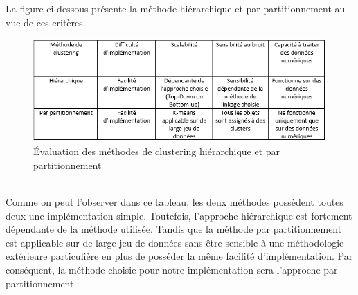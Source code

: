 \documentclass[memoire.tex]{subfiles}
\begin{document}
\newpage
La figure ci-dessous présente la méthode hiérarchique et par partitionnement au vue de ces critères.
	\begin{figure}[h!]
		\centerline{\includegraphics[scale=0.7]{img/comparatif_methodes_2.png}}
		\caption{Évaluation des méthodes de clustering hiérarchique et par partitionnement}
	\end{figure}\\
Comme on peut l'observer dans ce tableau, les deux méthodes possèdent toutes deux une implémentation simple. Toutefois, l'approche hiérarchique est fortement dépendante de la méthode utilisée. Tandis que la méthode par partitionnement est applicable sur de large jeu de données sans être sensible à une méthodologie extérieure particulière en plus de posséder la même facilité d'implémentation. Par conséquent, la méthode choisie pour notre implémentation sera l'approche par partitionnement.
\end{document}
